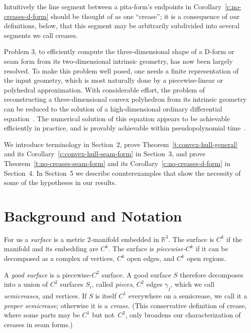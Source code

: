 \documentclass{article}
\newcommand\term[1]{{\it #1}}
\newcommand\R{\mathbb R}
\begin{document}
Intuitively the line segment between a pita-form's endpoints in
Corollary~\ref{c:no-creases-d-form} should be thought of as one
``crease''; it is a consequence of our definitions, below, that this
segment may be arbitrarily subdivided into several segments we call
creases.

Problem 3, to efficiently compute the three-dimensional shape of a
D-form or seam form from its two-dimensional intrinsic geometry, has
now been largely resolved.  To make this problem well posed, one needs
a finite representation of the input geometry, which is most naturally
done by a piecewise-linear or polyhedral approximation.  
With considerable effort, the
problem of reconstructing a three-dimensional convex polyhedron from
its intrinsic geometry can be
reduced to the solution of a high-dimensional ordinary differential
equation~\cite{BI}.  The numerical solution of this equation appears
to be achievable efficiently in practice, and is provably achievable
within pseudopolynomial time~\cite{KPD}.

We introduce terminology in Section~2, prove
Theorem~\ref{t:convex-hull-general} and its
Corollary~\ref{c:convex-hull-seam-form} in Section~3, and prove
Theorem~\ref{t:no-creases-seam-form} and its
Corollary~\ref{c:no-creases-d-form} in Section~4.  In Section~5 we
describe counterexamples that show the necessity of some of the
hypotheses in our results.



\section{Background and Notation} \label{sec:background}

For us a \term{surface} is a metric 2-manifold embedded in $\R^3$.  The
surface is $C^k$ if the manifold and its embedding are $C^k$.  The
surface is \term{piecewise-$C^k$} if it can be decomposed as a complex
of vertices, $C^k$ open edges, and $C^k$ open regions.

A \term{good surface} is a piecewise-$C^2$ surface.  A good surface
$S$ therefore decomposes into a union of $C^2$ surfaces $S_i$, called
\term{pieces}, $C^2$ edges $\gamma_j$, which we call
\term{semicreases}, and vertices.  If $S$ is itself $C^1$ everywhere on a
semicrease, we call it a \term{proper semicrease}; otherwise it is a
\term{crease}.  (This conservative definition of crease,
where some parts may be $C^1$ but not~$C^2$,
only broadens our characterization of creases in seam forms.)
\end{document}
